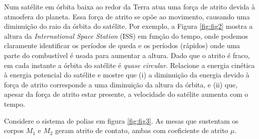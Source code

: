 \documentclass[]{IMTexam}
\begin{document}
\begin{questions}

	\medskip

	\question Num satélite em órbita baixa ao redor da Terra atua uma força de atrito devida à atmosfera do planeta. Essa força de atrito se opõe ao movimento, causando uma diminuição do raio da órbita do satélite. Por exemplo, a Figura \ref{fig:fig2} mostra a altura da \textit{International Space Station} (ISS) em função do tempo, onde podemos claramente identificar os períodos de queda e os períodos (rápidos) onde uma parte do combustível é usada para aumentar a altura. Dado que o atrito é fraco, em cada instante a órbita do satélite é \textit{quase circular}. Relacione a energia cinética à energia potencial do satélite e mostre que (i) a diminuição da energia devido à força de atrito corresponde a uma diminuição da altura da órbita, e (ii) que, apesar da força de atrito estar presente, a velocidade do satélite aumenta com o tempo.

	\begin{solution}

	\end{solution}

	\medskip

	\question Considere o sistema de polias em figura \ref{fig:fig3}. As mesas que sustentam os corpos $ M_1 $ e $ M_2 $ geram atrito de contato, ambas com coeficiente de atrito $\mu$.


\end{questions}
\end{document}
